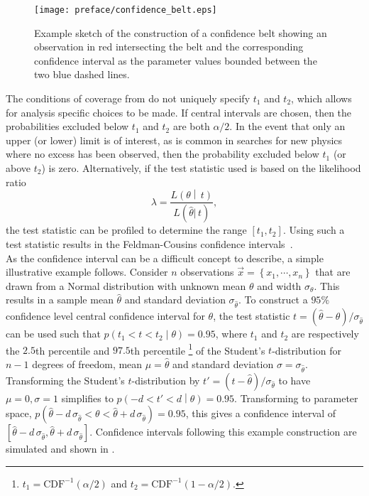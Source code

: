 \begin{figure}[htbp]
 \centering
 \texttt{[image: preface/confidence\_belt.eps]}
 \caption{Example sketch of the construction of a confidence belt showing an observation in red intersecting the belt and the corresponding confidence interval as the parameter values bounded between the two blue dashed lines.}\label{fig:confidence_belt}
\end{figure}

The conditions of coverage from  do not uniquely specify $t_{1}$ and $t_{2}$, which allows for analysis specific choices to be made.
If central intervals are chosen, then the probabilities excluded below $t_{1}$ and $t_{2}$ are both $\alpha/2$.
In the event that only an upper (or lower) limit is of interest, as is common in searches for new physics where no excess has been observed, then the probability excluded below $t_{1}$ (or above $t_{2}$) is zero.
Alternatively, if the test statistic used is based on the likelihood ratio
\[
 \lambda = \frac{L\left(\theta\middle|\, t\right)}{L(\hat{\theta}|\, t)},
\]
the test statistic can be profiled to determine the range $\left[t_{1}, t_{2}\right]$.
Using such a test statistic results in the Feldman-Cousins confidence intervals~\cite{Feldman:1997qc}.\\

As the confidence interval can be a difficult concept to describe, a simple illustrative example follows.
Consider $n$ observations $\vec{x} = \left\{x_{1}, \cdots, x_{n}\right\}$ that are drawn from a Normal distribution with unknown mean $\theta$ and width $\sigma_{\theta}$.
This results in a sample mean $\hat{\theta}$ and standard deviation $\sigma_{\hat{\theta}}$.
To construct a $95\%$ confidence level central confidence interval for $\theta$, the test statistic $t = \left(\hat{\theta} - \theta\right)/\sigma_{\hat{\theta}}$ can be used such that ${p\left(t_{1} < t < t_{2}\middle|\theta\right) = 0.95}$, where $t_{1}$ and $t_{2}$ are respectively the $2.5$th percentile and $97.5$th percentile%
\footnote{$t_{1} = \mathrm{CDF}^{-1}\left(\alpha/2\right)$ and $t_{2} = \mathrm{CDF}^{-1}\left(1 - \alpha/2\right)$.}
of the Student's $t$-distribution for $n-1$ degrees of freedom, mean $\mu=\hat{\theta}$ and standard deviation $\sigma=\sigma_{\hat{\theta}}$.
Transforming the Student's $t$-distribution by $t' = \left(t-\hat{\theta}\right)/\sigma_{\hat{\theta}}$ to have $\mu=0, \sigma=1$ simplifies to ${p\left(-d < t' < d\middle|\theta\right) = 0.95}$.
Transforming to parameter space, ${p\left(\hat{\theta} - d\, \sigma_{\hat{\theta}} < \theta < \hat{\theta} + d\, \sigma_{\hat{\theta}}\right)  = 0.95}$, this gives a confidence interval of $\left[\hat{\theta} - d\, \sigma_{\hat{\theta}}, \hat{\theta} + d\, \sigma_{\hat{\theta}}\right]$.
Confidence intervals following this example construction are simulated and shown in .

